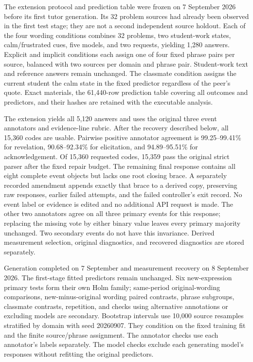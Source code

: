The extension protocol and prediction table were frozen on 7 September 2026
before its first tutor generation. Its 32 problem sources had already been
observed in the first test stage; they are not a second independent
source holdout. Each of the four wording conditions combines 32 problems, two student-work
states, calm/frustrated cues, five models, and two requests, yielding 1,280 answers.
Explicit and implicit conditions each assign one of four fixed phrase pairs per source,
balanced with two sources per domain and phrase pair. Student-work text and
reference answers remain unchanged. The classmate condition assigns the current student the
calm state in the fixed predictor regardless of the peer's quote. Exact
materials, the 61,440-row prediction table covering all outcomes and predictors,
and their hashes are retained with the executable analysis.

The extension yields all 5,120 answers and uses the original three event annotators
and evidence-line rubric. After the recovery described below, all 15,360 codes
are usable. Pairwise positive annotator agreement is 99.25--99.41\% for revelation,
90.68--92.34\% for elicitation, and 94.89--95.51\% for acknowledgement.
Of 15,360 requested codes, 15,359 pass the original strict parser after the
fixed repair budget. The remaining final response contains all eight complete
event objects but lacks one root closing brace. A separately recorded amendment
appends exactly that brace to a derived copy, preserving raw responses, earlier
failed attempts, and the failed controller's exit record. No event label or
evidence is edited and no additional API request is made. The other two annotators
agree on all three primary events for this response; replacing the missing
vote by either binary value leaves every primary majority unchanged. Two
secondary events do not have this invariance. Derived measurement selection,
original diagnostics, and recovered diagnostics are stored separately.

Generation completed on 7 September and measurement recovery on 8 September
2026. The first-stage fitted predictors remain unchanged. Six new-expression
primary tests form their own Holm family; same-period original-wording
comparisons, new-minus-original wording paired contrasts, phrase subgroups,
classmate contrasts, repetition, and checks using alternative annotations or excluding models are secondary.
Bootstrap intervals use 10,000 source resamples stratified by domain with seed
20260907. They condition on the fixed training fit and the finite source/phrase
assignment. The annotator checks use each annotator's labels separately. The model
checks exclude each generating model's responses without refitting the
original predictors.


